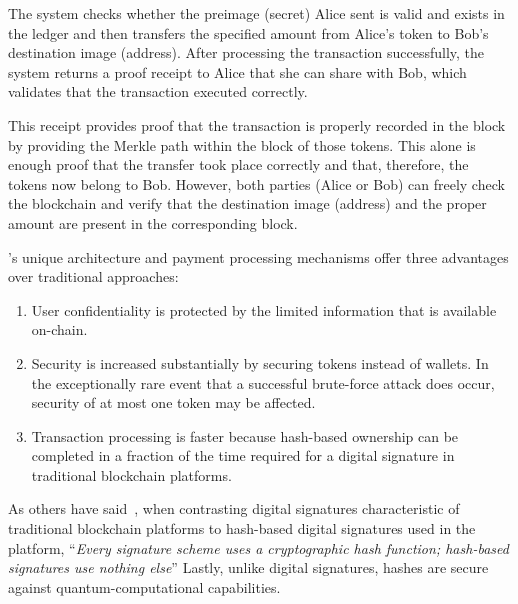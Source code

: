 The system checks whether the preimage (secret) Alice sent is valid and exists in the ledger and then transfers the specified amount from Alice's token to Bob's destination image (address). After processing the transaction successfully, the system returns a proof receipt to Alice that she can share with Bob, which validates that the transaction executed correctly.

This receipt provides proof that the transaction is properly recorded in the block by providing the Merkle path within the block of those tokens. This alone is enough proof that the transfer took place correctly and that, therefore, the tokens now belong to Bob. However, both parties (Alice or Bob) can freely check the blockchain and verify that the destination image (address) and the proper amount are present in the corresponding block.

\name's unique architecture and payment processing mechanisms offer three advantages over traditional approaches:

\begin{enumerate}
    \item User confidentiality is protected by the limited information that is available on-chain. 
    \item Security is increased substantially by securing tokens instead of wallets. In the exceptionally rare event that a successful brute-force attack does occur, security of at most one token may be affected. 
    \item Transaction processing is faster because hash-based ownership can be completed in a fraction of the time required for a digital signature in traditional blockchain platforms. 
 \end{enumerate}  
    
As others have said~\cite{sphincs}, when contrasting digital signatures characteristic of traditional blockchain platforms to hash-based digital signatures used in the \name platform, ``\textit{Every signature scheme uses a cryptographic hash function; hash-based signatures use nothing else}''  Lastly, unlike digital signatures, hashes are secure against quantum-computational capabilities.


